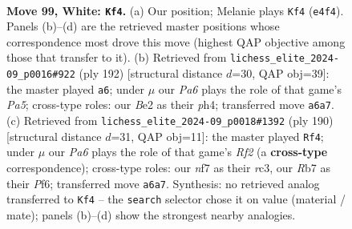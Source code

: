 \documentclass[11pt]{article}
\begin{document}
\clearpage

\begin{figure}[p]\centering
\begin{subfigure}{0.46\textwidth}\centering
\resizebox{\linewidth}{!}{%
\newchessgame
\chessboard[
  setfen={r3k3/1R3n2/P7/6P1/4K3/7P/2P1B3/8 w - - 5 99},
  showmover=false,
  pgfstyle=straightmove, color=movearrow, markmove={e4-f4}
]}
\caption{}
\end{subfigure}\hfill
\begin{subfigure}{0.46\textwidth}\centering
\resizebox{\linewidth}{!}{%
\newchessgame
\chessboard[
  setfen={r7/8/8/PK3kP1/R4n1p/7P/8/8 w - - 2 97},
  showmover=false,
  pgfstyle=straightmove, color=movearrow, markmove={a5-a6}
]}
\caption{}
\end{subfigure}
\\[4pt]
\begin{subfigure}{0.46\textwidth}\centering
\resizebox{\linewidth}{!}{%
\newchessgame
\chessboard[
  setfen={8/p4k2/2P2P2/3K4/8/P1r5/5R2/8 w - - 1 96},
  showmover=false,
  pgfstyle=straightmove, color=movearrow, markmove={f2-f4}
]}
\caption{}
\end{subfigure}\hfill

\caption{\textbf{Move 99, White: \texttt{Kf4}.} (a) Our position; Melanie plays \texttt{Kf4} (\texttt{e4f4}). Panels (b)--(d) are the retrieved master positions whose correspondence most drove this move (highest QAP objective among those that transfer to it). (b) Retrieved from \texttt{lichess\_elite\_2024-09\_p0016\#922} (ply 192) [structural distance $d$=30, QAP obj=39]: the master played \texttt{a6}; under $\mu$ our \emph{Pa6} plays the role of that game's \emph{Pa5}; cross-type roles: our \emph{B}e2 as their \emph{p}h4; transferred move \texttt{a6a7}. (c) Retrieved from \texttt{lichess\_elite\_2024-09\_p0018\#1392} (ply 190) [structural distance $d$=31, QAP obj=11]: the master played \texttt{Rf4}; under $\mu$ our \emph{Pa6} plays the role of that game's \emph{Rf2} (a \textbf{cross-type} correspondence); cross-type roles: our \emph{n}f7 as their \emph{r}c3, our \emph{R}b7 as their \emph{P}f6; transferred move \texttt{a6a7}. Synthesis: no retrieved analog transferred to \texttt{Kf4} -- the \texttt{search} selector chose it on value (material / mate); panels (b)--(d) show the strongest nearby analogies.}
\label{fig:thought-m196}
\end{figure}

\clearpage
\end{document}
